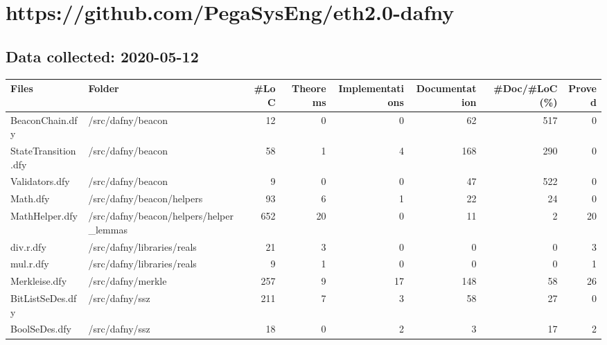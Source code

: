 \documentclass[a4paper, 12pt]{article}
\begin{document}
\section*{https://github.com/PegaSysEng/eth2.0-dafny}
\subsection*{Data collected: 2020-05-12}
\scriptsize
\begin{tabular}{llrrrrrr}
\toprule
                  Files &                                   Folder &  \#LoC &  Theorems &  Implementations &  Documentation &  \#Doc/\#LoC (\%) &  Proved \\
\midrule
        BeaconChain.dfy &                        /src/dafny/beacon &    12 &         0 &                0 &             62 &            517 &       0 \\
    StateTransition.dfy &                        /src/dafny/beacon &    58 &         1 &                4 &            168 &            290 &       0 \\
         Validators.dfy &                        /src/dafny/beacon &     9 &         0 &                0 &             47 &            522 &       0 \\
               Math.dfy &                /src/dafny/beacon/helpers &    93 &         6 &                1 &             22 &             24 &       0 \\
         MathHelper.dfy &  /src/dafny/beacon/helpers/helper\_lemmas &   652 &        20 &                0 &             11 &              2 &      20 \\
              div.r.dfy &               /src/dafny/libraries/reals &    21 &         3 &                0 &              0 &              0 &       3 \\
              mul.r.dfy &               /src/dafny/libraries/reals &     9 &         1 &                0 &              0 &              0 &       1 \\
          Merkleise.dfy &                        /src/dafny/merkle &   257 &         9 &               17 &            148 &             58 &      26 \\
       BitListSeDes.dfy &                           /src/dafny/ssz &   211 &         7 &                3 &             58 &             27 &       0 \\
          BoolSeDes.dfy &                           /src/dafny/ssz &    18 &         0 &                2 &              3 &             17 &       2 \\

\end{tabular}
\end{document}
